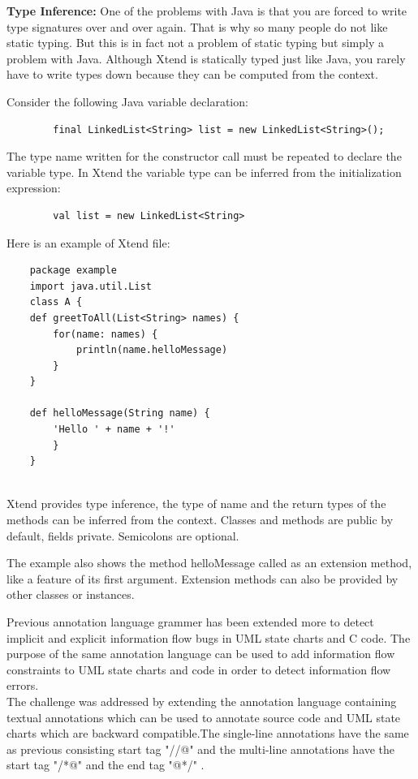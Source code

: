 \begin{itemize}
	\textbf{Type Inference:}
	One of the problems with Java is that you are forced to write type signatures over and over again. That is why so many people do not like static typing. But this is in fact not a problem of static typing but simply a problem with Java. Although Xtend is statically typed just like Java, you rarely have to write types down because they can be computed from the context.
	
	Consider the following Java variable declaration:
	\begin{lstlisting}
		final LinkedList<String> list = new LinkedList<String>();
	\end{lstlisting}
	The type name written for the constructor call must be repeated to declare the variable type. In Xtend the variable type can be inferred from the initialization expression:
	\begin{lstlisting}
		val list = new LinkedList<String>
	\end{lstlisting}
		
	Here is an example of Xtend file:
	\begin{lstlisting}
	package example	
	import java.util.List		
	class A {
	def greetToAll(List<String> names) {
		for(name: names) {
			println(name.helloMessage)
		}
	}
		
	def helloMessage(String name) {
		'Hello ' + name + '!'
		}
	}
	
	\end{lstlisting} 
	   
Xtend provides type inference, the type of name and the return types of the methods can be inferred from the context. Classes and methods are public by default, fields private. Semicolons are optional.
	
The example also shows the method helloMessage called as an extension method, like a feature of its first argument. Extension methods can also be provided by other classes or instances.
\end{itemize}


Previous annotation language grammer has been extended more
to detect implicit and explicit information flow bugs in UML
state charts and C code. The purpose of the same annotation language
can be used to add information flow constraints to UML state
charts and code in order to detect information flow errors.\\

The challenge was addressed by extending the annotation language containing textual annotations which can be used to annotate source code and UML state charts which are backward compatible.The single-line annotations have the same as previous consisting start tag "//@" and the multi-line annotations have the start tag "/*@" and the end tag "@*/" .\\

